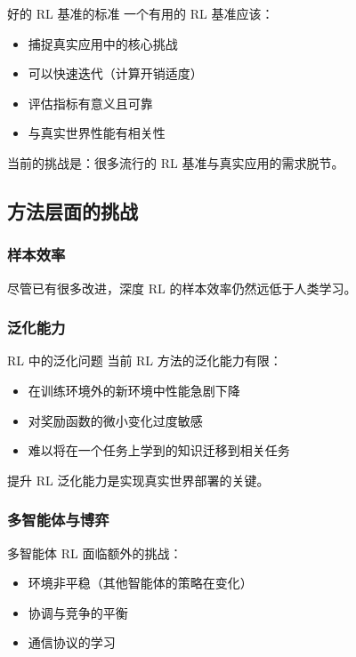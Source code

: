 \documentclass[a4paper]{article}
\begin{document}
\begin{knowledgebox}{好的 RL 基准的标准}
一个有用的 RL 基准应该：
\begin{itemize}
    \item 捕捉真实应用中的核心挑战
    \item 可以快速迭代（计算开销适度）
    \item 评估指标有意义且可靠
    \item 与真实世界性能有相关性
\end{itemize}
当前的挑战是：很多流行的 RL 基准与真实应用的需求脱节。
\end{knowledgebox}

\subsection{方法层面的挑战}

\subsubsection{样本效率}

尽管已有很多改进，深度 RL 的样本效率仍然远低于人类学习。

\subsubsection{泛化能力}

\begin{importantbox}{RL 中的泛化问题}
当前 RL 方法的泛化能力有限：
\begin{itemize}
    \item 在训练环境外的新环境中性能急剧下降
    \item 对奖励函数的微小变化过度敏感
    \item 难以将在一个任务上学到的知识迁移到相关任务
\end{itemize}
提升 RL 泛化能力是实现真实世界部署的关键。
\end{importantbox}

\subsubsection{多智能体与博弈}

多智能体 RL 面临额外的挑战：
\begin{itemize}
    \item 环境非平稳（其他智能体的策略在变化）
    \item 协调与竞争的平衡
    \item 通信协议的学习
\end{itemize}
\end{document}
